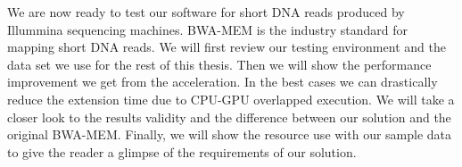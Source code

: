 We are now ready to test our software for short DNA reads produced by Illummina sequencing machines. BWA-MEM is the industry standard for mapping short DNA reads. We will first review our testing environment and the data set we use for the rest of this thesis. Then we will show the performance improvement we get from the acceleration. In the best cases we can drastically reduce the extension time due to CPU-GPU overlapped execution. We will take a closer look to the results validity and the difference between our solution and the original BWA-MEM. Finally, we will show the resource use with our sample data to give the reader a glimpse of the requirements of our solution.